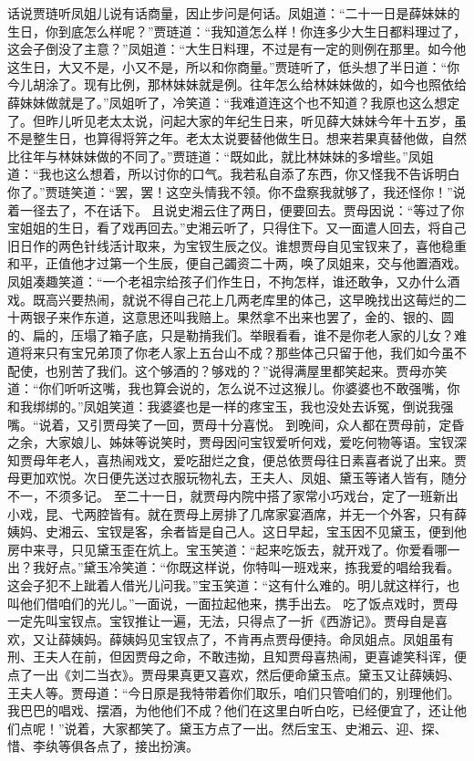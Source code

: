 \documentclass[12pt,oneside]{book}
\begin{document}
话说贾琏听凤姐儿说有话商量，因止步问是何话。凤姐道：“二十一日是薛妹妹的生日，你到底怎么样呢？”贾琏道：“我知道怎么样！你连多少大生日都料理过了，这会子倒没了主意？”凤姐道：“大生日料理，不过是有一定的则例在那里。如今他这生日，大又不是，小又不是，所以和你商量。”贾琏听了，低头想了半日道：“你今儿胡涂了。现有比例，那林妹妹就是例。往年怎么给林妹妹做的，如今也照依给薛妹妹做就是了。”凤姐听了，冷笑道：“我难道连这个也不知道？我原也这么想定了。但昨儿听见老太太说，问起大家的年纪生日来，听见薛大妹妹今年十五岁，虽不是整生日，也算得将笄之年。老太太说要替他做生日。想来若果真替他做，自然比往年与林妹妹做的不同了。”贾琏道：“既如此，就比林妹妹的多增些。”凤姐道：“我也这么想着，所以讨你的口气。我若私自添了东西，你又怪我不告诉明白你了。”贾琏笑道：“罢，罢！这空头情我不领。你不盘察我就够了，我还怪你！”说着一径去了，不在话下。
且说史湘云住了两日，便要回去。贾母因说：“等过了你宝姐姐的生日，看了戏再回去。”史湘云听了，只得住下。又一面遣人回去，将自己旧日作的两色针线活计取来，为宝钗生辰之仪。谁想贾母自见宝钗来了，喜他稳重和平，正值他才过第一个生辰，便自己蠲资二十两，唤了凤姐来，交与他置酒戏。凤姐凑趣笑道：“一个老祖宗给孩子们作生日，不拘怎样，谁还敢争，又办什么酒戏。既高兴要热闹，就说不得自己花上几两老库里的体己，这早晚找出这莓烂的二十两银子来作东道，这意思还叫我赔上。果然拿不出来也罢了，金的、银的、圆的、扁的，压塌了箱子底，只是勒掯我们。举眼看看，谁不是你老人家的儿女？难道将来只有宝兄弟顶了你老人家上五台山不成？那些体己只留于他，我们如今虽不配使，也别苦了我们。这个够酒的？够戏的？”说得满屋里都笑起来。贾母亦笑道：“你们听听这嘴，我也算会说的，怎么说不过这猴儿。你婆婆也不敢强嘴，你和我绑绑的。”凤姐笑道：我婆婆也是一样的疼宝玉，我也没处去诉冤，倒说我强嘴。“说着，又引贾母笑了一回，贾母十分喜悦。
到晚间，众人都在贾母前，定昏之余，大家娘儿、姊妹等说笑时，贾母因问宝钗爱听何戏，爱吃何物等语。宝钗深知贾母年老人，喜热闹戏文，爱吃甜烂之食，便总依贾母往日素喜者说了出来。贾母更加欢悦。次日便先送过衣服玩物礼去，王夫人、凤姐、黛玉等诸人皆有，随分不一，不须多记。
至二十一日，就贾母内院中搭了家常小巧戏台，定了一班新出小戏，昆、弋两腔皆有。就在贾母上房排了几席家宴酒席，并无一个外客，只有薛姨妈、史湘云、宝钗是客，余者皆是自己人。这日早起，宝玉因不见黛玉，便到他房中来寻，只见黛玉歪在炕上。宝玉笑道：“起来吃饭去，就开戏了。你爱看哪一出？我好点。”黛玉冷笑道：“你既这样说，你特叫一班戏来，拣我爱的唱给我看。这会子犯不上跐着人借光儿问我。”宝玉笑道：“这有什么难的。明儿就这样行，也叫他们借咱们的光儿。”一面说，一面拉起他来，携手出去。
吃了饭点戏时，贾母一定先叫宝钗点。宝钗推让一遍，无法，只得点了一折《西游记》。贾母自是喜欢，又让薛姨妈。薛姨妈见宝钗点了，不肯再点贾母便持。命凤姐点。凤姐虽有刑、王夫人在前，但因贾母之命，不敢违拗，且知贾母喜热闹，更喜谑笑科诨，便点了一出《刘二当衣》。贾母果真更又喜欢，然后便命黛玉点。黛玉又让薛姨妈、王夫人等。贾母道：“今日原是我特带着你们取乐，咱们只管咱们的，别理他们。我巴巴的唱戏、摆酒，为他他们不成？他们在这里白听白吃，已经便宜了，还让他们点呢！”说着，大家都笑了。黛玉方点了一出。然后宝玉、史湘云、迎、探、惜、李纨等俱各点了，接出扮演。
\end{document}
